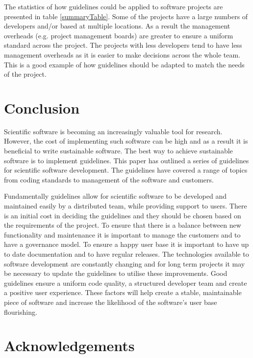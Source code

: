 \documentclass[jnr]{iosart2x}
\begin{document}
The statistics of how guidelines could be applied to software projects are presented in table \ref{summaryTable}.
Some of the projects have a large numbers of developers and/or based at multiple locations.
As a result the management overheads (e.g. project management boards) are greater to ensure a uniform standard across the project.
The projects with less developers tend to have less management overheads as it is easier to make decisions across the whole team.
This is a good example of how guidelines should be adapted to match the needs of the project.

\section{Conclusion}
\label{Conclusion}

Scientific software is becoming an increasingly valuable tool for research.
However, the cost of implementing such software can be high and as a result it is beneficial to write sustainable software.
The best way to achieve sustainable software is to implement guidelines.
This paper has outlined a series of guidelines for scientific software development.
The guidelines have covered a range of topics from coding standards to management of the software and customers.

Fundamentally guidelines allow for scientific software to be developed and maintained easily by a distributed team, while providing support to users.
There is an initial cost in deciding the guidelines and they should be chosen based on the requirements of the project.
To ensure that there is a balance between new functionality and maintenance it is important to manage the customers and to have a governance model.
To ensure a happy user base it is important to have up to date documentation and to have regular releases.
The technologies available to software development are constantly changing and for long term projects it may be necessary to update the guidelines to utilise these improvements.
Good guidelines ensure a uniform code quality, a structured developer team and create a positive user experience.
These factors will help create a stable, maintainable piece of software and increase the likelihood of the software's user base flourishing.

\section{Acknowledgements}
\label{Acknowledgements}
\end{document}
